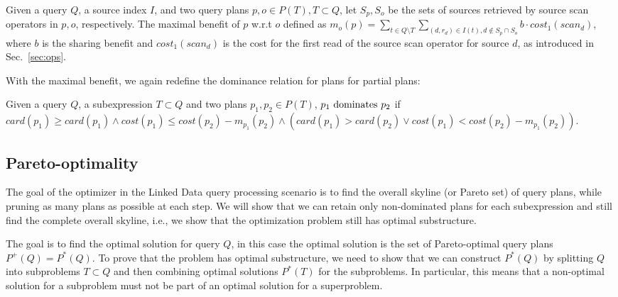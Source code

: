 \begin{definition}
  Given a query $Q$, a source index $I$, and two query plans $p,o \in
  P(T), T \subset Q$, let $S_p,S_o$ be the sets of sources retrieved
  by source scan operators in $p,o$, respectively. The maximal benefit
  of $p$ w.r.t $o$ defined as $m_o(p) = \sum_{t \in Q \setminus T}
  \sum_{(d,r_d) \in I(t), d \notin S_p \cap S_o } b \cdot
  cost_1(scan_d)$, where $b$ is the sharing benefit and
  $cost_1(scan_d)$ is the cost for the first read of the source scan
  operator for source $d$, as introduced in Sec.~\ref{sec:ops}.
\end{definition}


With the maximal benefit, we again redefine the dominance relation for
plans for partial plans:

\begin{definition}
  Given a query $Q$, a subexpression $T \subset Q$ and two plans
  $p_1,p_2 \in P(T)$, $p_1 \mbox{ \textnormal{dominates} } p_2$ if
  $card(p_1) \geq card(p_1) \wedge cost(p_1) \leq cost(p_2) -
  m_{p_1}(p_2) \wedge (card(p_1) > card(p_2) \vee cost(p_1) <
  cost(p_2) - m_{p_1}(p_2))$.
\end{definition}


\subsection{Pareto-optimality}
\label{sec:pareto}

The goal of the optimizer in the Linked Data query processing scenario
is to find the overall skyline (or Pareto set) of query plans, while
pruning as many plans as possible at each step. We will show that we
can retain only non-dominated plans for each subexpression and still
find the complete overall skyline, i.e., we show that the optimization
problem still has optimal substructure.

The goal is to find the optimal solution for query $Q$, in this case
the optimal solution is the set of Pareto-optimal query plans $P^+(Q)
= P^*(Q)$. To prove that the problem has optimal substructure, we need
to show that we can construct $P^*(Q)$ by splitting $Q$ into
subproblems $T \subset Q$ and then combining optimal solutions
$P^*(T)$ for the subproblems. In particular, this means that a
non-optimal solution for a subproblem must not be part of an optimal
solution for a superproblem.

